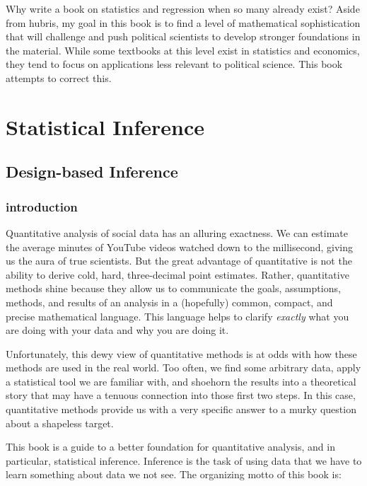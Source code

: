 \documentclass[
  letterpaper,
  DIV=11,
  numbers=noendperiod]{scrreprt}
\theoremstyle{definition}
\theoremstyle{plain}
\theoremstyle{definition}
\theoremstyle{remark}
\begin{document}
Why write a book on statistics and regression when so many already
exist? Aside from hubris, my goal in this book is to find a level of
mathematical sophistication that will challenge and push political
scientists to develop stronger foundations in the material. While some
textbooks at this level exist in statistics and economics, they tend to
focus on applications less relevant to political science. This book
attempts to correct this.

\part{Statistical Inference}

\hypertarget{design-based-inference}{%
\chapter{Design-based Inference}\label{design-based-inference}}

\hypertarget{introduction-1}{%
\section{introduction}\label{introduction-1}}

Quantitative analysis of social data has an alluring exactness. We can
estimate the average minutes of YouTube videos watched down to the
millisecond, giving us the aura of true scientists. But the great
advantage of quantitative is not the ability to derive cold, hard,
three-decimal point estimates. Rather, quantitative methods shine
because they allow us to communicate the goals, assumptions, methods,
and results of an analysis in a (hopefully) common, compact, and precise
mathematical language. This language helps to clarify \emph{exactly}
what you are doing with your data and why you are doing it.

Unfortunately, this dewy view of quantitative methods is at odds with
how these methods are used in the real world. Too often, we find some
arbitrary data, apply a statistical tool we are familiar with, and
shoehorn the results into a theoretical story that may have a tenuous
connection into those first two steps. In this case, quantitative
methods provide us with a very specific answer to a murky question about
a shapeless target.

This book is a guide to a better foundation for quantitative analysis,
and in particular, statistical inference. Inference is the task of using
data that we have to learn something about data we not see. The
organizing motto of this book is:
\end{document}
